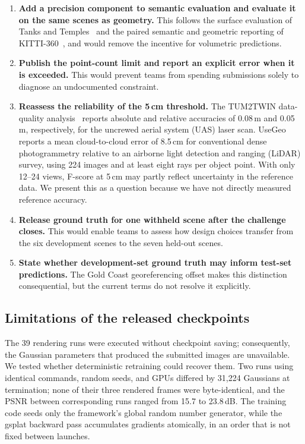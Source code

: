 \documentclass[10pt,twocolumn,letterpaper]{article}
\begin{document}
\begin{enumerate}[1.]\itemsep2pt
\item \textbf{Add a precision component to semantic evaluation and evaluate it
      on the same scenes as geometry.} This follows the surface evaluation of
      Tanks and Temples~\cite{knapitsch2017tanks} and the paired semantic and
      geometric reporting of KITTI-360~\cite{liao2022kitti360}, and would remove
      the incentive for volumetric predictions.
\item \textbf{Publish the point-count limit and report an explicit error when it
      is exceeded.} This would prevent teams from spending submissions solely to
      diagnose an undocumented constraint.
\item \textbf{Reassess the reliability of the 5\,cm threshold.} The TUM2TWIN
      data-quality analysis~\cite[Tab.~2]{wysocki2026tum2twin} reports absolute
      and relative accuracies of 0.08\,m and 0.05\,m, respectively, for the
      uncrewed aerial system (UAS) laser scan. UseGeo~\cite{nex2023usegeo}
      reports a mean cloud-to-cloud error of 8.5\,cm for conventional dense
      photogrammetry relative to an airborne light detection and ranging (LiDAR)
      survey, using 224 images and at least eight rays per object point. With only
      12--24 views, F-score at 5\,cm may partly reflect uncertainty in the
      reference data. We present this as a question because we have not directly
      measured reference accuracy.
\item \textbf{Release ground truth for one withheld scene after the challenge
      closes.} This would enable teams to assess how design choices transfer from
      the six development scenes to the seven held-out scenes.
\item \textbf{State whether development-set ground truth may inform test-set
      predictions.} The Gold Coast georeferencing offset makes this distinction
      consequential, but the current terms do not resolve it explicitly.
\end{enumerate}

\subsection{Limitations of the released checkpoints}

The 39 rendering runs were executed without checkpoint saving; consequently, the
Gaussian parameters that produced the submitted images are unavailable. We
tested whether deterministic retraining could recover them. Two runs using
identical commands, random seeds, and GPUs differed by 31{,}224 Gaussians at
termination; none of their three rendered frames were byte-identical, and the
PSNR between corresponding runs ranged from 15.7 to 23.8\,dB. The training code
seeds only the framework's global random number generator, while the gsplat
backward pass accumulates gradients atomically, in an order that is not fixed
between launches.
\end{document}
